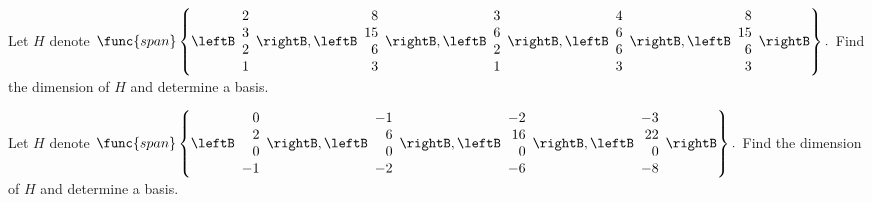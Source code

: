 \begin{enumialphparenastyle}
\begin{ex} Let $H$ denote $\func{span}\left\{ \leftB 
\begin{array}{r}
2 \\ 
3 \\ 
2 \\ 
1
\end{array}
\rightB ,\leftB 
\begin{array}{r}
8 \\ 
15 \\ 
6 \\ 
3
\end{array}
\rightB ,\leftB 
\begin{array}{r}
3 \\ 
6 \\ 
2 \\ 
1
\end{array}
\rightB ,\leftB 
\begin{array}{r}
4 \\ 
6 \\ 
6 \\ 
3
\end{array}
\rightB ,\leftB 
\begin{array}{r}
8 \\ 
15 \\ 
6 \\ 
3
\end{array}
\rightB \right\} .$ Find the dimension of $H$ and determine a basis.
\end{ex}

\begin{ex} Let $H$ denote $\func{span}\left\{ \leftB 
\begin{array}{r}
0 \\ 
2 \\ 
0 \\ 
-1
\end{array}
\rightB ,\leftB 
\begin{array}{r}
-1 \\ 
6 \\ 
0 \\ 
-2
\end{array}
\rightB ,\leftB 
\begin{array}{r}
-2 \\ 
16 \\ 
0 \\ 
-6
\end{array}
\rightB ,\leftB 
\begin{array}{r}
-3 \\ 
22 \\ 
0 \\ 
-8
\end{array}
\rightB \right\} .$ Find the dimension of $H$ and determine a basis.
\end{ex}


\end{enumialphparenastyle}
